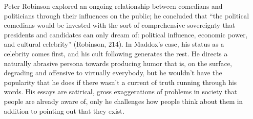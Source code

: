 Peter Robinson explored an ongoing relationship between comedians and
politicians through their influences on the public; he concluded that ``the
political comedians would be invested with the sort of comprehensive sovereignty
that presidents and candidates can only dream of: political influence, economic
power, and cultural celebrity'' (Robinson, 214). In Maddox's case, his status as
a celebrity comes first, and his cult following generates the rest. He directs a
naturally abrasive persona towards producing humor that is, on the surface,
degrading and offensive to virtually everybody, but he wouldn't have the
popularity that he does if there wasn't a current of truth running through his
words. His essays are satirical, gross exaggerations of problems in society that
people are already aware of, only he challenges how people think about them in
addition to pointing out that they exist.
